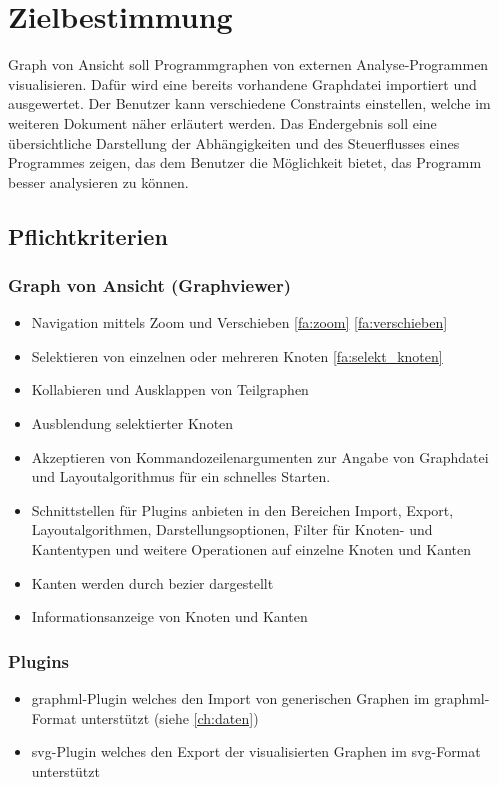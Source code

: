\chapter{Zielbestimmung}

Graph von Ansicht soll Programmgraphen von externen Analyse-Programmen visualisieren. Dafür wird eine bereits vorhandene Graphdatei importiert und ausgewertet. Der Benutzer kann verschiedene Constraints einstellen, welche im weiteren Dokument näher erläutert werden.
Das Endergebnis soll eine übersichtliche Darstellung der Abhängigkeiten und des Steuerflusses eines Programmes zeigen, das dem Benutzer die Möglichkeit bietet, das Programm besser analysieren zu können.

\section{Pflichtkriterien}

\subsection{Graph von Ansicht (Graphviewer)}
  \begin{itemize}
    \item Navigation mittels Zoom und Verschieben \ref{fa:zoom} \ref{fa:verschieben}
    \item Selektieren von einzelnen oder mehreren Knoten \ref{fa:selekt_knoten}
    \item Kollabieren und Ausklappen von Teilgraphen %
    \item Ausblendung selektierter Knoten
    \item Akzeptieren von Kommandozeilenargumenten zur Angabe von Graphdatei und Layoutalgorithmus für ein schnelles Starten.
    \item Schnittstellen für Plugins anbieten in den Bereichen Import, Export, Layoutalgorithmen, Darstellungsoptionen, Filter für Knoten- und Kantentypen und weitere Operationen auf einzelne Knoten und Kanten
    \item Kanten werden durch \gls{bezier} dargestellt
    \item Informationsanzeige von Knoten und Kanten
  \end{itemize}
  
\subsection{Plugins}
  \begin{itemize}
    \item \gls{graphml}-Plugin welches den Import von generischen Graphen im \gls{graphml}-Format unterstützt (siehe \ref{ch:daten})
    \item \gls{svg}-Plugin welches den Export der visualisierten Graphen im \gls{svg}-Format unterstützt
  \end{itemize}
  
